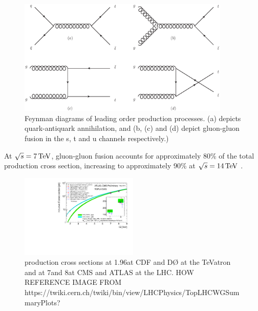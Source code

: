 \begin{figure}[hbtp]
   \centering
     \includegraphics[width=0.9\textwidth]{Chapters/03_Theory/Images/ttbar_production}\hfill \caption{Feynman
     diagrams of leading order \ttbar production processes. (a) depicts quark-antiquark annihilation, and (b,
     (c) and (d) depict gluon-gluon fusion in the s, t and u channels respectively.)}
     \label{fig:ttbar_production}
\end{figure}

At $\sqrt{s}=7\,\text{Te\hspace{-.08em}V}$, gluon-gluon fusion accounts for approximately 80\% of the total \tquark production cross
section, increasing to approximately 90\% at $\sqrt{s}=14\,\text{Te\hspace{-.08em}V}$ \cite{Agashe:2014kda}.

\begin{figure}[hbtp]
   \centering
     \includegraphics[width=0.5\textwidth]{Chapters/03_Theory/Images/toplhcwg_ttxsec_sqrts_may2015}\hfill
     \caption{\ttbar production cross sections at 1.96\TeV at CDF and D{\O} at the TeVatron and at 7\TeV and
     8\TeV at CMS and ATLAS at the LHC. HOW REFERENCE IMAGE FROM
     https://twiki.cern.ch/twiki/bin/view/LHCPhysics/TopLHCWGSummaryPlots?}
     \label{fig:ttbar_cross_sections}
\end{figure}

